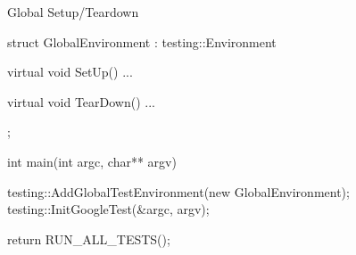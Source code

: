 \begin{frame}[fragile]{Global Setup/Teardown}
\begin{c++}
struct GlobalEnvironment : testing::Environment
{
    virtual void SetUp()
    { ... }

    virtual void TearDown()
    { ... }
};

int main(int argc, char** argv)
{
    testing::AddGlobalTestEnvironment(new GlobalEnvironment);
    testing::InitGoogleTest(&argc, argv);

    return RUN_ALL_TESTS();
}
\end{c++}
\end{frame}
